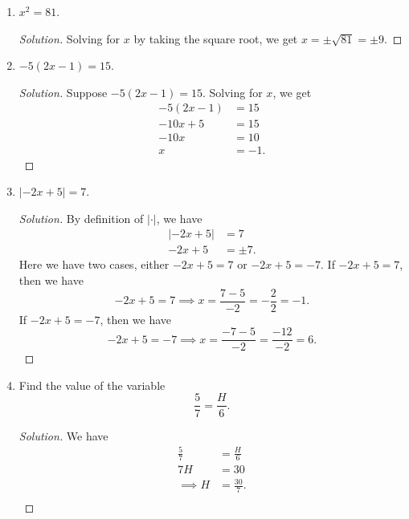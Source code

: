 \documentclass{article}
\begin{document}
\begin{enumerate}
\item \( x^2 = 81\).
\begin{proof}[Solution]
    Solving for \(x \) by taking the square root, we get \( x = \pm \sqrt{81} = \pm 9.  \)
\end{proof}

\item \( -5 (2x - 1) = 15\).
\begin{proof}[Solution]
    Suppose \( -5(2x - 1) = 15\). Solving for \( x \), we get 
    \begin{align*}
        -5(2x-1)&= 15 \\
        -10x +5 &= 15 \\
        -10x &= 10 \\
        x &= -1.
    \end{align*}
\end{proof}

\item \( |-2x+5| = 7 \).
\begin{proof}[Solution]
    By definition of \( |\cdot|\), we have 
    \begin{align*}
        |-2x + 5 |&= 7  \\
        -2x + 5 &= \pm 7. 
    \end{align*}
Here we have two cases, either \( -2x + 5 = 7 \) or \( -2x + 5 = -7\). If \( -2x + 5 = 7 \), then 
we have 
\[ -2x + 5 = 7 \implies x = \frac{7-5}{-2} = -\frac{2}{2} = -1. \]
If \( -2x + 5 = -7 \), then we have 
\[ -2x + 5 = -7 \implies x = \frac{-7 - 5}{-2} = \frac{-12}{-2} = 6.\]
\end{proof}

\item Find the value of the variable
    \[ \frac{5}{7} = \frac{H}{6}.\]
\begin{proof}[Solution]
We have 
\begin{align*}
    \frac{5}{7} &= \frac{H}{6}  \\
     7H &= 30  \\
     \implies H &= \frac{30}{7}. \\
\end{align*}
\end{proof}


\end{enumerate}
\end{document}
